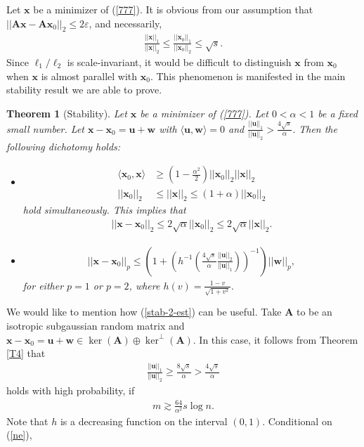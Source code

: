 \documentclass[11pt]{article}
\numberwithin{equation}{section}
\theoremstyle{plain}
\newtheorem{Th}{Theorem}[section]
\theoremstyle{definition}
\def\A{{\mathbf A}}
\def\x{{\mathbf x}}
\def\e{{\varepsilon}}
\def\u{{\mathbf{u}}}
\def\w{{\mathbf{w}}}
\begin{document}
Let $\x$ be a minimizer of (\ref{777}). It is obvious from our assumption that $||\A\x-\A\x_0||_2\leq 2\e$, and necessarily, 
\begin{align}
\frac{||\x||_1}{||\x||_2}\leq\frac{||\x_0||_1}{||\x_0||_2}\leq\sqrt{s}. \label{key}
\end{align}
Since $\ell_1/\ell_2$ is scale-invariant, it would be difficult to distinguish $\x$ from $\x_0$ when $\x$ is almost parallel with $\x_0$. This phenomenon is manifested in the main stability result we are able to prove.    
\begin{Th}[Stability]\label{T6}
Let $\x$ be a minimizer of (\ref{777}). Let $0<\alpha<1$ be a fixed small number. Let $\x-\x_0=\u+\w$ with $\langle \u, \w\rangle=0$ and $\frac{||\u||_1}{||\u||_2}>\frac{4\sqrt{s}}{\alpha}$. Then the following dichotomy holds:
\begin{itemize}
\item \begin{align*}
\langle \x_0, \x\rangle &\geq \left(1-\frac{\alpha^2}{2}\right)||\x_0||_2||\x||_2\\
||\x_0||_2&\leq||\x||_2\leq (1+ \alpha)||\x_0||_2
\end{align*} 
hold simultaneously. This implies that
\begin{align*}
||\x-\x_0||_2\leq 2\sqrt{\alpha}||\x_0||_2\leq 2\sqrt{\alpha}||\x||_2. 
\end{align*}  

\item \begin{align}
||\x-\x_0||_p\leq \left(1+\left(h^{-1}\left(\frac{4\sqrt{s}}{\alpha}\frac{||\u||_2}{||\u||_1}\right)\right)^{-1}\right)||\w||_p,\label{stab-2-est}
\end{align}
for either $p=1$ or $p=2$,  where $h(v)=\frac{1-v}{\sqrt{1+v^2}}$.  
\end{itemize}
\end{Th}
We would like to mention how (\ref{stab-2-est}) can be useful. Take $\A$ to be an isotropic subgaussian random matrix and $\x-\x_0=\u+\w\in\ker(\A)\oplus\ker^\perp(\A)$. In this case, it follows from Theorem \ref{T4} that  
\begin{align}
\frac{||\u||_1}{||\u||_2}\geq\frac{8\sqrt{s}}{\alpha}>\frac{4\sqrt{s}}{\alpha}\label{ne}
\end{align}   
holds with high probability, if 
\begin{align*}
m\gtrsim \frac{64}{\alpha^2}s\log n.
\end{align*} 
Note that $h$ is a decreasing function on the interval $(0,1)$. Conditional on (\ref{ne}), 
\end{document}
